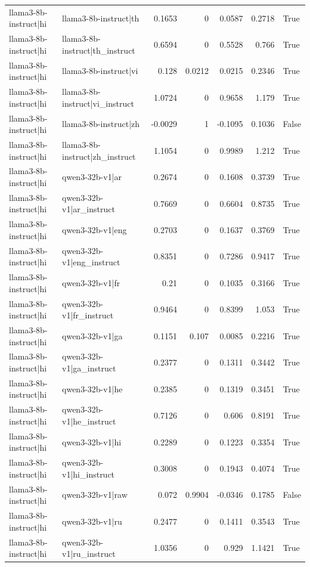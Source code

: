 \begin{table}
\begin{tabular}{l l r r r r l}
llama3-8b-instruct|hi & llama3-8b-instruct|th & 0.1653 & 0 & 0.0587 & 0.2718 & True \\
llama3-8b-instruct|hi & llama3-8b-instruct|th_instruct & 0.6594 & 0 & 0.5528 & 0.766 & True \\
llama3-8b-instruct|hi & llama3-8b-instruct|vi & 0.128 & 0.0212 & 0.0215 & 0.2346 & True \\
llama3-8b-instruct|hi & llama3-8b-instruct|vi_instruct & 1.0724 & 0 & 0.9658 & 1.179 & True \\
llama3-8b-instruct|hi & llama3-8b-instruct|zh & -0.0029 & 1 & -0.1095 & 0.1036 & False \\
llama3-8b-instruct|hi & llama3-8b-instruct|zh_instruct & 1.1054 & 0 & 0.9989 & 1.212 & True \\
llama3-8b-instruct|hi & qwen3-32b-v1|ar & 0.2674 & 0 & 0.1608 & 0.3739 & True \\
llama3-8b-instruct|hi & qwen3-32b-v1|ar_instruct & 0.7669 & 0 & 0.6604 & 0.8735 & True \\
llama3-8b-instruct|hi & qwen3-32b-v1|eng & 0.2703 & 0 & 0.1637 & 0.3769 & True \\
llama3-8b-instruct|hi & qwen3-32b-v1|eng_instruct & 0.8351 & 0 & 0.7286 & 0.9417 & True \\
llama3-8b-instruct|hi & qwen3-32b-v1|fr & 0.21 & 0 & 0.1035 & 0.3166 & True \\
llama3-8b-instruct|hi & qwen3-32b-v1|fr_instruct & 0.9464 & 0 & 0.8399 & 1.053 & True \\
llama3-8b-instruct|hi & qwen3-32b-v1|ga & 0.1151 & 0.107 & 0.0085 & 0.2216 & True \\
llama3-8b-instruct|hi & qwen3-32b-v1|ga_instruct & 0.2377 & 0 & 0.1311 & 0.3442 & True \\
llama3-8b-instruct|hi & qwen3-32b-v1|he & 0.2385 & 0 & 0.1319 & 0.3451 & True \\
llama3-8b-instruct|hi & qwen3-32b-v1|he_instruct & 0.7126 & 0 & 0.606 & 0.8191 & True \\
llama3-8b-instruct|hi & qwen3-32b-v1|hi & 0.2289 & 0 & 0.1223 & 0.3354 & True \\
llama3-8b-instruct|hi & qwen3-32b-v1|hi_instruct & 0.3008 & 0 & 0.1943 & 0.4074 & True \\
llama3-8b-instruct|hi & qwen3-32b-v1|raw & 0.072 & 0.9904 & -0.0346 & 0.1785 & False \\
llama3-8b-instruct|hi & qwen3-32b-v1|ru & 0.2477 & 0 & 0.1411 & 0.3543 & True \\
llama3-8b-instruct|hi & qwen3-32b-v1|ru_instruct & 1.0356 & 0 & 0.929 & 1.1421 & True \\

\end{tabular}
\end{table}
